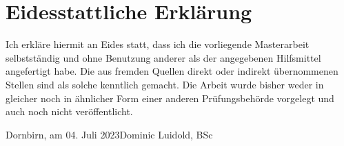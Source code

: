 \documentclass[a4paper,12pt,twoside]{scrreprt}
\begin{document}
\cleardoublepage
\chapter*{Eidesstattliche Erklärung}

Ich erkläre hiermit an Eides statt, dass ich die vorliegende Masterarbeit selbstständig und ohne Benutzung anderer als der angegebenen Hilfsmittel angefertigt habe. Die aus fremden Quellen direkt oder indirekt übernommenen Stellen sind als solche kenntlich gemacht. Die Arbeit wurde bisher weder in gleicher noch in ähnlicher Form einer anderen Prüfungsbehörde vorgelegt und auch noch nicht veröffentlicht.

\vspace{5cm}
\noindent
Dornbirn, am 04. Juli 2023\hfill Dominic Luidold, BSc
\end{document}
